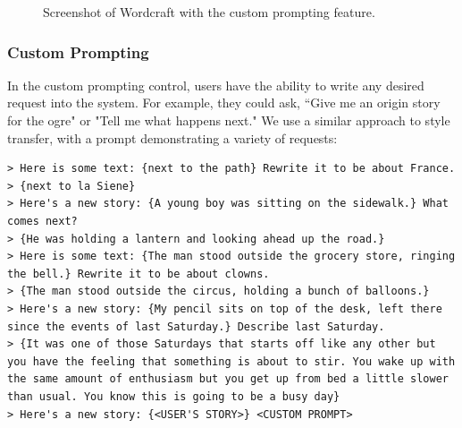 \begin{figure}[tbp]
  \centering
  \caption{Screenshot of Wordcraft with the custom prompting feature.\label{fig:wc}}
\end{figure} 

\subsubsection{Custom Prompting}
In the custom prompting control, users have the ability to write any desired request into the system. For example, they could ask, ``Give me an origin story for the ogre" or "Tell me what happens next." We use a similar approach to style transfer, with a prompt demonstrating a variety of requests:

\begin{lstlisting}
> Here is some text: {next to the path} Rewrite it to be about France.
> {next to la Siene}
> Here's a new story: {A young boy was sitting on the sidewalk.} What comes next?
> {He was holding a lantern and looking ahead up the road.}
> Here is some text: {The man stood outside the grocery store, ringing the bell.} Rewrite it to be about clowns.
> {The man stood outside the circus, holding a bunch of balloons.}
> Here's a new story: {My pencil sits on top of the desk, left there since the events of last Saturday.} Describe last Saturday.
> {It was one of those Saturdays that starts off like any other but you have the feeling that something is about to stir. You wake up with the same amount of enthusiasm but you get up from bed a little slower than usual. You know this is going to be a busy day}
> Here's a new story: {<USER'S STORY>} <CUSTOM PROMPT>
\end{lstlisting}

